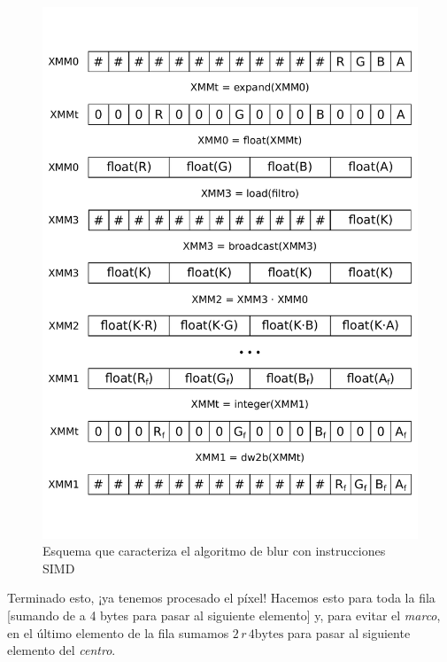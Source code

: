 \begin{figure}
  \centering
  \includegraphics[width=0.7\columnwidth]{esquema_blur.pdf}
  \caption{Esquema que caracteriza el algoritmo de blur con
    instrucciones {\ttfamily SIMD}}
  \label{fig:esquema_blur}
\end{figure}


Terminado esto, ¡ya tenemos procesado el píxel! Hacemos esto para toda
la fila [sumando de a 4 bytes para pasar al siguiente elemento] y,
para evitar el \emph{marco}, en el último elemento de la fila sumamos
$2\,r \, 4\text{bytes}$ para pasar al siguiente elemento del
\emph{centro}.

